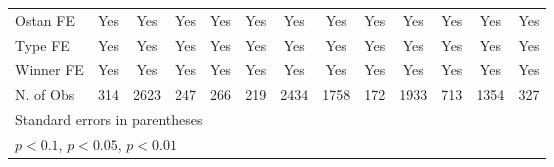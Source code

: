 {\begin{longtable}{l*{12}{c}}
Ostan FE        &      Yes         &      Yes         &      Yes         &      Yes         &      Yes         &      Yes         &      Yes         &      Yes         &      Yes         &      Yes         &      Yes         &      Yes         \\
Type FE         &      Yes         &      Yes         &      Yes         &      Yes         &      Yes         &      Yes         &      Yes         &      Yes         &      Yes         &      Yes         &      Yes         &      Yes         \\
Winner FE       &      Yes         &      Yes         &      Yes         &      Yes         &      Yes         &      Yes         &      Yes         &      Yes         &      Yes         &      Yes         &      Yes         &      Yes         \\
N. of Obs       &      314         &     2623         &      247         &      266         &      219         &     2434         &     1758         &      172         &     1933         &      713         &     1354         &      327         \\
\bottomrule
\multicolumn{13}{l}{\footnotesize Standard errors in parentheses}\\
\multicolumn{13}{l}{\footnotesize \sym{*} \(p<0.1\), \sym{**} \(p<0.05\), \sym{***} \(p<0.01\)}\\
\end{longtable}
}
